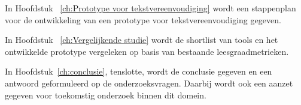 In Hoofdstuk ~\ref{ch:Prototype voor tekstvereenvoudiging} wordt een stappenplan voor de ontwikkeling van een prototype voor tekstvereenvoudiging gegeven.

In Hoofdstuk ~\ref{ch:Vergelijkende studie} wordt de shortlist van tools en het ontwikkelde prototype vergeleken op basis van bestaande leesgraadmetrieken.

In Hoofdstuk~\ref{ch:conclusie}, tenslotte, wordt de conclusie gegeven en een antwoord geformuleerd op de onderzoeksvragen. Daarbij wordt ook een aanzet gegeven voor toekomstig onderzoek binnen dit domein.
